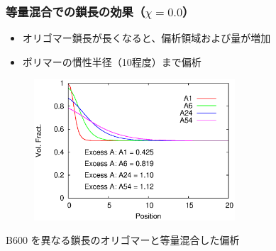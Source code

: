 \documentclass[12pt, dvipdfmx]{beamer}
\begin{document}
%
\begin{frame}\frametitle{等量混合での鎖長の効果（$\chi = 0.0$）}

\begin{itemize}
	\item オリゴマー鎖長が長くなると、偏析領域および量が増加
	\item ポリマーの慣性半径（10程度）まで偏析
\end{itemize}

\vspace{-0.5\baselineskip}
\begin{figure}[htbp]
	\begin{center}
		\includegraphics[width=75mm]{Sym_B600_All.eps}
	\end{center}
\end{figure}

\begin{center}
\vspace{-0.5\baselineskip}
{\small B600 を異なる鎖長のオリゴマーと等量混合した偏析}
\end{center}

\end{frame}
\end{document}

